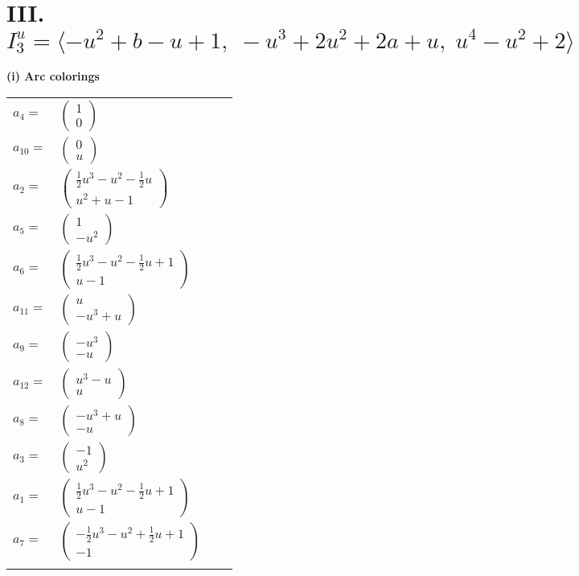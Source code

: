 \documentclass[1p]{elsarticle_modified}
\theoremstyle{definition}
\begin{document}
\centering \section*{III. $I^u_{3}= \langle - u^2+b- u+1,\;- u^3+2 u^2+2 a+u,\;u^4- u^2+2 \rangle$}
\flushleft \textbf{(i) Arc colorings}\\
\begin{tabular}{m{7pt} m{180pt} m{7pt} m{180pt} }
\flushright $a_{4}=$&$\begin{pmatrix}1\\0\end{pmatrix}$ \\
\flushright $a_{10}=$&$\begin{pmatrix}0\\u\end{pmatrix}$ \\
\flushright $a_{2}=$&$\begin{pmatrix}\frac{1}{2} u^3- u^2-\frac{1}{2} u\\u^2+u-1\end{pmatrix}$ \\
\flushright $a_{5}=$&$\begin{pmatrix}1\\- u^2\end{pmatrix}$ \\
\flushright $a_{6}=$&$\begin{pmatrix}\frac{1}{2} u^3- u^2-\frac{1}{2} u+1\\u-1\end{pmatrix}$ \\
\flushright $a_{11}=$&$\begin{pmatrix}u\\- u^3+u\end{pmatrix}$ \\
\flushright $a_{9}=$&$\begin{pmatrix}- u^3\\- u\end{pmatrix}$ \\
\flushright $a_{12}=$&$\begin{pmatrix}u^3- u\\u\end{pmatrix}$ \\
\flushright $a_{8}=$&$\begin{pmatrix}- u^3+u\\- u\end{pmatrix}$ \\
\flushright $a_{3}=$&$\begin{pmatrix}-1\\u^2\end{pmatrix}$ \\
\flushright $a_{1}=$&$\begin{pmatrix}\frac{1}{2} u^3- u^2-\frac{1}{2} u+1\\u-1\end{pmatrix}$ \\
\flushright $a_{7}=$&$\begin{pmatrix}-\frac{1}{2} u^3- u^2+\frac{1}{2} u+1\\-1\end{pmatrix}$\\&\end{tabular}
\end{document}
